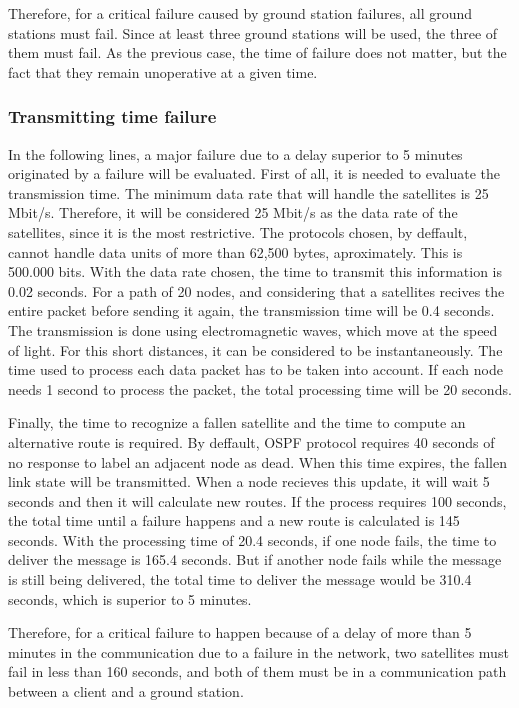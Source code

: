 Therefore, for a critical failure caused by ground station failures, all ground stations must fail. Since at least three ground stations will be used, the three of them must fail. As the previous case, the time of failure does not matter, but the fact that they remain unoperative at a given time.

\subsubsection{Transmitting time failure}
In the following lines, a major failure due to a delay superior to 5 minutes originated by a failure will be evaluated. First of all, it is needed to evaluate the transmission time. The minimum data rate that will handle the satellites is 25 Mbit/s. Therefore, it will be considered 25 Mbit/s as the data rate of the satellites, since it is the most restrictive. The protocols chosen, by deffault, cannot handle data units of more than 62,500 bytes, aproximately. This is 500.000 bits. With the data rate chosen, the time to transmit this information is 0.02 seconds. For a path of 20 nodes, and considering that a satellites recives the entire packet before sending it again, the transmission time will be 0.4 seconds. The transmission is done using electromagnetic waves, which move at the speed of light. For this short distances, it can be considered to be instantaneously. The time used to process each data packet has to be taken into account. If each node needs 1 second to process the packet, the total processing time will be 20 seconds. 

Finally, the time to recognize a fallen satellite and the time to compute an alternative route is required. By deffault, OSPF protocol requires 40 seconds of no response to label an adjacent node as dead. When this time expires, the fallen link state will be transmitted. When a node recieves this update, it will wait 5 seconds and then it will calculate new routes. If the process requires 100 seconds, the total time until a failure happens and a new route is calculated is 145 seconds. With the processing time of 20.4 seconds, if one node fails, the time to deliver the message is 165.4 seconds. But if another node fails while the message is still being delivered, the total time to deliver the message would be 310.4 seconds, which is superior to 5 minutes.

Therefore, for a critical failure to happen because of a delay of more than 5 minutes in the communication due to a failure in the network, two satellites must fail in less than 160 seconds, and both of them must be in a communication path between a client and a ground station.